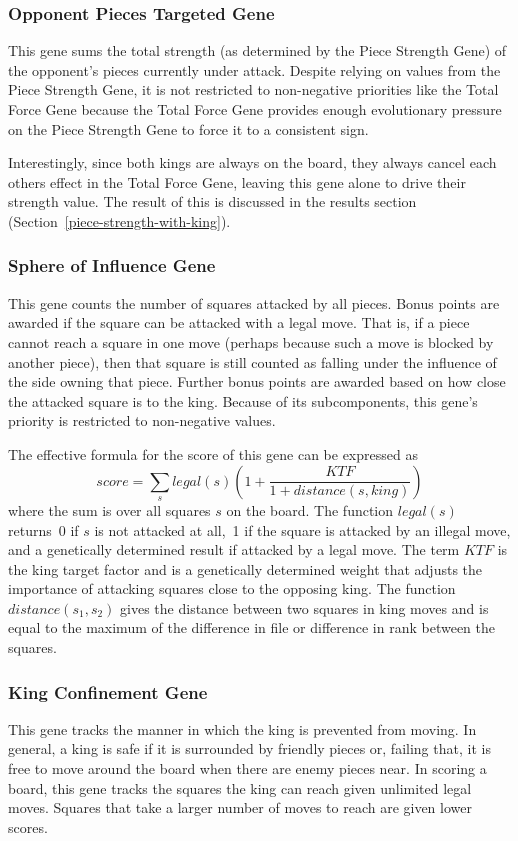 \documentclass[letterpaper]{article}
\renewcommand{\_}{\allowbreak\textunderscore\allowbreak}
\begin{document}
\subsubsection{Opponent Pieces Targeted Gene}\label{opponent-pieces-targeted}
This gene sums the total strength (as determined by the Piece Strength Gene) of the opponent's pieces currently under attack. Despite relying on values from the Piece Strength Gene, it is not restricted to non-negative priorities like the Total Force Gene because the Total Force Gene provides enough evolutionary pressure on the Piece Strength Gene to force it to a consistent sign.

Interestingly, since both kings are always on the board, they always cancel each others effect in the Total Force Gene, leaving this gene alone to drive their strength value. The result of this is discussed in the results section (Section~\ref{piece-strength-with-king}).

\subsubsection{Sphere of Influence Gene}
This gene counts the number of squares attacked by all pieces. Bonus points are awarded if the square can be attacked with a legal move. That is, if a piece cannot reach a square in one move (perhaps because such a move is blocked by another piece), then that square is still counted as falling under the influence of the side owning that piece. Further bonus points are awarded based on how close the attacked square is to the king. Because of its subcomponents, this gene's priority is restricted to non-negative values.

The effective formula for the score of this gene can be expressed as
\[score = \sum_s legal(s)\left(1+\frac{KTF}{1+distance(s,king)}\right)\]
where the sum is over all squares \(s\) on the board. The function \(legal(s)\) returns~0 if \(s\) is not attacked at all,~1 if the square is attacked by an illegal move, and a genetically determined result if attacked by a legal move. The term \(KTF\) is the king target factor and is a genetically determined weight that adjusts the importance of attacking squares close to the opposing king. The function \(distance(s_1, s_2)\) gives the distance between two squares in king moves and is equal to the maximum of the difference in file or difference in rank between the squares.

\subsubsection{King Confinement Gene}
This gene tracks the manner in which the king is prevented from moving. In general, a king is safe if it is surrounded by friendly pieces or, failing that, it is free to move around the board when there are enemy pieces near. In scoring a board, this gene tracks the squares the king can reach given unlimited legal moves. Squares that take a larger number of moves to reach are given lower scores.
\end{document}

